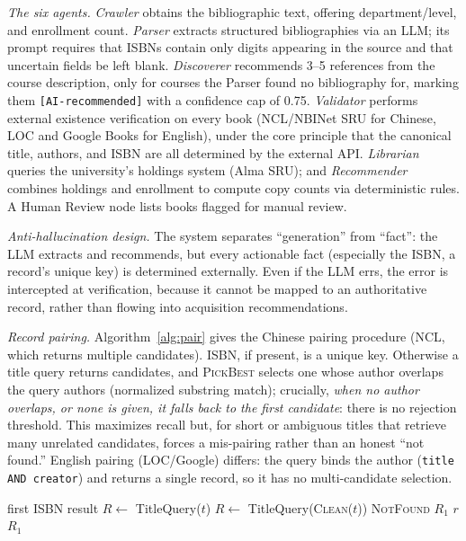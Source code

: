 \documentclass[conference]{IEEEtran}
\begin{document}
\textit{The six agents.} \textit{Crawler} obtains the bibliographic text,
offering department/level, and enrollment count. \textit{Parser} extracts
structured bibliographies via an LLM; its prompt requires that ISBNs contain
only digits appearing in the source and that uncertain fields be left blank.
\textit{Discoverer} recommends 3--5 references from the course description, only
for courses the Parser found no bibliography for, marking them
\texttt{[AI-recommended]} with a confidence cap of 0.75. \textit{Validator}
performs external existence verification on every book (NCL/NBINet SRU for
Chinese, LOC and Google Books for English), under the core principle that the
canonical title, authors, and ISBN are all determined by the external API.
\textit{Librarian} queries the university's holdings system (Alma SRU); and
\textit{Recommender} combines holdings and enrollment to compute copy counts via
deterministic rules. A Human Review node lists books flagged for manual review.

\textit{Anti-hallucination design.} The system separates ``generation'' from
``fact'': the LLM extracts and recommends, but every actionable fact
(especially the ISBN, a record's unique key) is determined externally. Even if
the LLM errs, the error is intercepted at verification, because it cannot be
mapped to an authoritative record, rather than flowing into acquisition
recommendations.

\textit{Record pairing.} Algorithm~\ref{alg:pair} gives the Chinese pairing
procedure (NCL, which returns multiple candidates). ISBN, if present, is a
unique key. Otherwise a title query returns candidates, and \textsc{PickBest}
selects one whose author overlaps the query authors (normalized substring
match); crucially, \emph{when no author overlaps, or none is given, it falls
back to the first candidate}: there is no rejection threshold. This maximizes
recall but, for short or ambiguous titles that retrieve many unrelated
candidates, forces a mis-pairing rather than an honest ``not found.'' English
pairing (LOC/Google) differs: the query binds the author (\texttt{title AND
creator}) and returns a single record, so it has no multi-candidate selection.

\begin{algorithm}[t]
\caption{Verifier record pairing (Chinese/NCL)}
\label{alg:pair}
\small
\begin{algorithmic}[1]
     \State \Return first ISBN result 
  \EndIf
  \State $R \gets$ TitleQuery($t$)
   $R \gets$ TitleQuery(\textsc{Clean}($t$)) \EndIf
   \Return \textsc{NotFound} \EndIf
  \State \Return {}
\EndFunction
{}
   \Return $R_1$ \EndIf
      \Return $r$ \EndIf
  \EndFor
  \State \Return $R_1$ 
\EndFunction
\end{algorithmic}
\end{algorithm}
\end{document}
